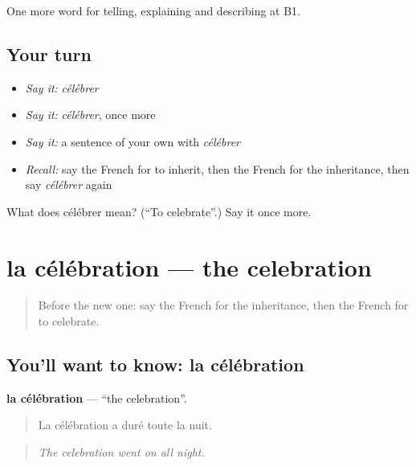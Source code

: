 \begin{grammarlens}[title={What you've built}]
One more word for telling, explaining and describing at B1.
\end{grammarlens}

\subsection*{Your turn}
\begin{itemize}
\raggedright
  \item \emph{Say it:} \emph{célébrer}
  \item \emph{Say it:} \emph{célébrer}, once more
  \item \emph{Say it:} a sentence of your own with \emph{célébrer}
  \item \emph{Recall:} say the French for to inherit, then the French for the inheritance, then say \emph{célébrer} again
\end{itemize}

\begin{tcolorbox}[breakable,colback=teal!4,colframe=teal!35!black,title={Before you move on}]
What does célébrer mean? (\textquotedblleft{}To celebrate\textquotedblright{}.) Say it once more.
\end{tcolorbox}
\section[la célébration]{la célébration — the celebration}

\label{lesson:FR-C316-celebration}



\begin{quote}
Before the new one: say the French for the inheritance, then the French for to celebrate.
\end{quote}

\subsection*{You'll want to know: la célébration}
\textbf{la célébration} — \textquotedblleft{}the celebration\textquotedblright{}.

\begin{quote}
La célébration a duré toute la nuit.
\end{quote}

\begin{quote}
\emph{The celebration went on all night.}
\end{quote}

